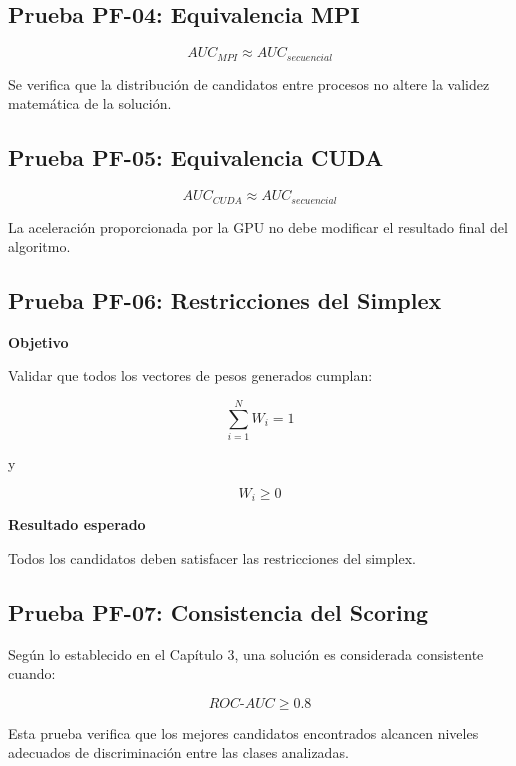 
\subsection{Prueba PF-04: Equivalencia MPI}

\[
AUC_{MPI}\approx AUC_{secuencial}
\]

Se verifica que la distribución de candidatos entre procesos no altere la validez matemática de la solución.


\subsection{Prueba PF-05: Equivalencia CUDA}

\[
AUC_{CUDA}\approx AUC_{secuencial}
\]

La aceleración proporcionada por la GPU no debe modificar el resultado final del algoritmo.


\subsection{Prueba PF-06: Restricciones del Simplex}

\textbf{Objetivo}

Validar que todos los vectores de pesos generados cumplan:

\[
\sum_{i=1}^{N}W_i=1
\]

y

\[
W_i \ge 0
\]

\textbf{Resultado esperado}

Todos los candidatos deben satisfacer las restricciones del simplex.


\subsection{Prueba PF-07: Consistencia del Scoring}

Según lo establecido en el Capítulo 3, una solución es considerada consistente cuando:

\[
ROC\text{-}AUC \ge 0.8
\]

Esta prueba verifica que los mejores candidatos encontrados alcancen niveles adecuados de discriminación entre las clases analizadas.

